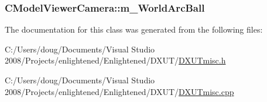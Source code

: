 \label{class_c_model_viewer_camera_ace6a5534406f4dcb72515a15e1e1b4e3}
\hypertarget{class_c_model_viewer_camera_a0afd3536bbea8ac01986f9e08af5e0bf}{
\subsubsection[{m\_\-WorldArcBall}]{ {\bf CModelViewerCamera::m\_\-WorldArcBall}}}
\label{class_c_model_viewer_camera_a0afd3536bbea8ac01986f9e08af5e0bf}


The documentation for this class was generated from the following files:\begin{DoxyCompactItemize}
\item 
C:/Users/doug/Documents/Visual Studio 2008/Projects/enlightened/Enlightened/DXUT/\hyperlink{_d_x_u_tmisc_8h}{DXUTmisc.h}\item 
C:/Users/doug/Documents/Visual Studio 2008/Projects/enlightened/Enlightened/DXUT/\hyperlink{_d_x_u_tmisc_8cpp}{DXUTmisc.cpp}\end{DoxyCompactItemize}
